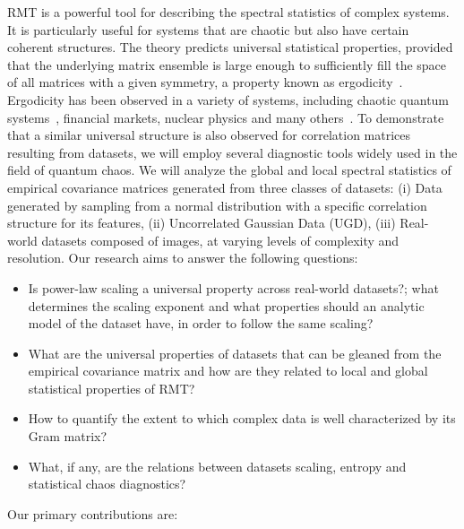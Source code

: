 \documentclass{article}
\begin{document}
RMT is a powerful tool for describing the spectral statistics of complex systems. It is particularly useful for systems that are chaotic but also have certain coherent structures. The theory predicts universal statistical properties, provided that the underlying matrix ensemble is large enough to sufficiently fill the space of all matrices with a given symmetry, a property known as ergodicity~\citep{Guhr_1998}. Ergodicity has been observed in a variety of systems, including chaotic quantum systems~\citep{bohigas1984characterization,mehta1991random,pandey1983random}, financial markets, nuclear physics and many others~\citep{plerou1999random,brody1981random,efetov1997supersymmetry}. 
To demonstrate that a similar universal structure is also observed for correlation matrices resulting from datasets, we will employ several diagnostic tools widely used in the field of quantum chaos. We will analyze the global and local spectral statistics of empirical covariance matrices generated from three classes of datasets: (i) Data generated by sampling from a normal distribution with a specific correlation structure for its features, (ii) Uncorrelated Gaussian Data (UGD), (iii) Real-world datasets composed of images, at varying levels of complexity and resolution.
Our research aims to answer the following questions:
\setlength{\leftmargini}{16pt}
\begin{itemize} \raggedright
    \item Is power-law scaling a universal property across real-world datasets?; 
    what determines the scaling exponent and
    what properties should an analytic model of the dataset have, in order to follow the same scaling?
    \item 
    What are the universal properties of datasets that can be gleaned from the empirical covariance matrix and how are they related to local and global  statistical properties of RMT?
    \item 
    How to quantify the extent to which complex data is well characterized by its Gram matrix?
    \item What, if any, are the relations between datasets scaling, entropy and statistical chaos diagnostics?
\end{itemize}
Our primary contributions are:
\end{document}
